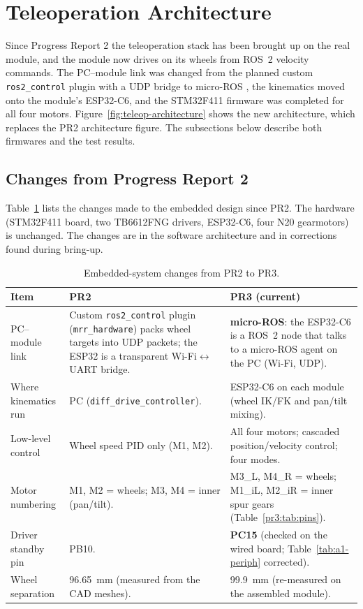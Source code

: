 \documentclass[12pt,a4paper]{article}
\begin{document}
\clearpage
\section{Teleoperation Architecture}
\label{sec:teleop-architecture}

Since Progress Report 2 the teleoperation stack has been brought up on the real module, and
the module now drives on its wheels from ROS~2 velocity commands. The PC--module link was
changed from the planned custom \texttt{ros2\_control} plugin with a UDP bridge to
micro-ROS \cite{microros}, the kinematics moved onto the module's ESP32-C6, and the STM32F411
firmware was completed for all four motors. Figure~\ref{fig:teleop-architecture} shows the
new architecture, which replaces the PR2 architecture figure. The subsections below describe
both firmwares and the test results.

\subsection{Changes from Progress Report 2}

Table~\ref{pr3:tab:changes} lists the changes made to the embedded design since PR2.
The hardware (STM32F411 board, two TB6612FNG drivers, ESP32-C6, four N20 gearmotors)
is unchanged. The changes are in the software architecture and in corrections found
during bring-up.

\begin{table}[H]
\centering
\caption{Embedded-system changes from PR2 to PR3.}
\label{pr3:tab:changes}
\small
\begin{tabularx}{\linewidth}{>{\raggedright\arraybackslash}p{3.0cm} >{\raggedright\arraybackslash}X >{\raggedright\arraybackslash}X}
\toprule
Item & PR2 & PR3 (current) \\
\midrule
PC--module link &
  Custom \texttt{ros2\_control} plugin (\texttt{mrr\_hardware}) packs wheel targets into UDP packets;
  the ESP32 is a transparent Wi-Fi$\leftrightarrow$UART bridge. &
  \textbf{micro-ROS}: the ESP32-C6 is a ROS~2 node that talks to a micro-ROS agent on the PC
  (Wi-Fi, UDP). \\
Where kinematics run &
  PC (\texttt{diff\_drive\_controller}). &
  ESP32-C6 on each module (wheel IK/FK and pan/tilt mixing). \\
Low-level control &
  Wheel speed PID only (M1, M2). &
  All four motors; cascaded position/velocity control; four modes. \\
Motor numbering &
  M1, M2 = wheels; M3, M4 = inner (pan/tilt). &
  M3\_L, M4\_R = wheels; M1\_iL, M2\_iR = inner spur gears (Table~\ref{pr3:tab:pins}). \\
Driver standby pin &
  PB10. &
  \textbf{PC15} (checked on the wired board; Table~\ref{tab:a1-periph} corrected). \\
Wheel separation &
  \SI{96.65}{mm} (measured from the CAD meshes). &
  \SI{99.9}{mm} (re-measured on the assembled module). \\
\bottomrule
\end{tabularx}
\end{table}
\end{document}
